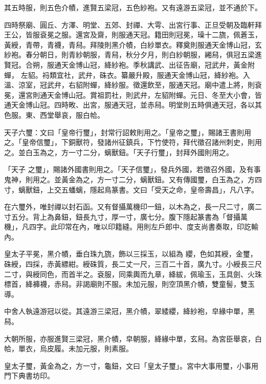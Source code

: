 \begin{pinyinscope}
 其五時服，則五色介幘，進賢五梁冠，五色紗袍。又有遠游五梁冠，並不通於下。



 四時祭廟、圓丘、方澤、明堂、五郊、封禪、大雩、出宮行事、正旦受朝及臨軒拜王公，皆服袞冕之服。還宮及齋，則服通天冠。籍田則冠冕，璪十二旒，佩蒼玉，黃綬，青帶，青襪，青舄。拜陵則黑介幘，白紗單衣。釋奠則服通天金博山冠，玄紗袍。春分朝日，則青紗朝服，青舄，秋分夕月，則白紗朝服，緗舄，俱冠五梁進賢冠。合朔，服通天金博山冠，絳紗袍。季秋講武、出征告廟，冠武弁，黃金附蟬，
 左貂。祃類宜社，武弁，硃衣。纂嚴升殿，服通天金博山冠，絳紗袍。入溫、涼室，冠武弁，右貂附蟬，絳紗服。徵還飲至，服通天冠。廟中遣上將，則袞冕，還宮則通天金博山冠。賞祖罰社，則武弁，左貂附蟬。元日、冬至大小會，皆通天金博山冠。四時畋、出宮，服通天冠，並赤舄。明堂則五時俱通天冠，各以其色服。東、西堂舉哀，服白帢。



 天子六璽：文曰「皇帝行璽」，封常行詔敕則用之。「皇帝之璽」，賜諸王書則用之。「皇帝信璽」，下銅獸符，發諸州征鎮兵，下竹使符，拜代徵召諸州刺史，則用之。並白玉為之，方一寸二分，螭獸鈕。「天子行璽」，封拜外國則用之。



 「天子
 之璽」，賜諸外國書則用之。「天子信璽」，發兵外國，若徵召外國，及有事鬼神，則用之。並黃金為之，方一寸二分，螭獸鈕。又有傳國璽，白玉為之，方四寸，螭獸鈕，上交五蟠螭，隱起鳥篆書。文曰「受天之命，皇帝壽昌」，凡八字。



 在六璽外，唯封禪以封石函。又有督攝萬機印一鈕，以木為之，長一尺二寸，廣二寸五分。背上為鼻鈕，鈕長九寸，厚一寸，廣七分。腹下隱起篆書為「督攝萬機」，凡四字。此印常在內，唯以印籍縫。用則左戶郎中、度支尚書奏取，印訖輸內。



 皇太子平冕，黑介幘，垂白珠九旒，飾以三採玉，以組為
 纓，色如其綬，金璽，硃綬，四採，赤黃縹紺。綬硃質，長二丈一尺，三百二十首，廣九寸。小綬長三尺二寸，與綬同色，而首半之。袞服，同乘輿而九章，絳紱，佩瑜玉，玉具劍、火珠標首，絳褲襪，赤舄。非謁廟則不服。未加元服，則空頂黑介幘，雙童髻，雙玉導。



 中舍人執遠游冠以從。其遠游三梁冠，黑介幘，翠緌纓，絳紗袍，皁緣中單，黑舄。



 大朝所服，亦服進賢三梁冠，黑介幘，皁朝服，絳緣中單，玄舄。為宮臣舉哀，白帢，單衣，烏皮履。未加元服，則素服。



 皇太子璽，黃金為之，方一寸，龜鈕，文曰「皇太子璽」。宮中大事用璽，小事用門下典書坊印。




\end{pinyinscope}
